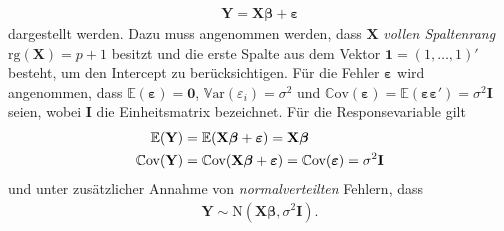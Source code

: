 \documentclass[12pt, a4paper]{report}\usepackage[]{graphicx}\usepackage[]{color}
\begin{document}
\begin{align}\label{Eq_klass_lin_matrix}
\mathbf{Y}=\mathbf{X}\boldsymbol{\beta}+\boldsymbol{\varepsilon}
\end{align}
dargestellt werden. Dazu muss angenommen werden, dass $\mathbf{X}$ \textit{vollen Spaltenrang} $\text{rg}(\mathbf{X})=p+1$ besitzt und die erste Spalte aus dem Vektor $\mathbf{1}=(1,\dots, 1)'$ besteht, um den Intercept zu berücksichtigen. Für die Fehler $\boldsymbol{\varepsilon}$ wird angenommen, dass  $\mathbb{E}(\boldsymbol{\varepsilon})=\mathbf{0}$, $\mathbb{V}\text{ar}(\varepsilon_i)=\sigma^2$ und $\mathbb{C}\text{ov}(\boldsymbol{\varepsilon})=\mathbb{E}(\boldsymbol{\varepsilon}\boldsymbol{\varepsilon}')=\sigma^2\mathbf{I}$ seien, wobei $\mathbf{I}$ die Einheitsmatrix bezeichnet. Für die Responsevariable gilt
\begin{align}
\mathbb{E}(\mathbf{Y})&=\mathbb{E}(\mathbf{X} \boldsymbol{\beta}+\boldsymbol{\varepsilon})=\mathbf{X} \boldsymbol{\beta} \notag \\ 
\mathbb{C}\text{ov}(\mathbf{Y})&=\mathbb{C}\text{ov}(\mathbf{X} \boldsymbol{\beta}+\boldsymbol{\varepsilon})=\mathbb{C}\text{ov}(\boldsymbol{\varepsilon})=\sigma^2\mathbf{I} \label{Eq_Cov_epsilon}
\end{align}
und unter zusätzlicher Annahme von \textit{normalverteilten} Fehlern, dass
\begin{align*}
\mathbf{Y} \sim \text{N}(\mathbf{X}\boldsymbol{\beta}, \sigma^2 \mathbf{I}).
\end{align*} 
\end{document}
